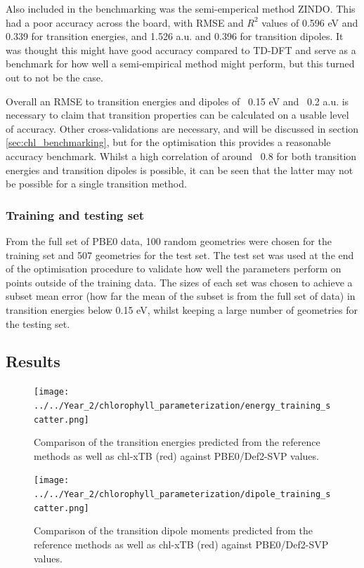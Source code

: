 Also included in the benchmarking was the semi-emperical method ZINDO. This had a
poor accuracy across the board, with RMSE and $R^2$ values of 0.596 eV and 0.339
for transition energies, and 1.526 a.u. and 0.396 for transition dipoles. It was
thought this might have good accuracy compared to TD-DFT and serve as a benchmark
for how well a semi-empirical method might perform, but this turned out to not be
the case.

Overall an RMSE to transition energies and dipoles of ~0.15 eV and ~0.2 a.u. is 
necessary to claim that transition properties can be calculated on a usable level 
of accuracy. Other cross-validations are necessary, and will be discussed in section
\ref{sec:chl_benchmarking}, but for the optimisation this provides a reasonable 
accuracy benchmark. Whilst a high correlation of around ~0.8 for both transition 
energies and transition dipoles is possible, it can be seen that the latter may 
not be possible for a single transition method.

\subsubsection{Training and testing set}
\label{subsubsec:train_test}
From the full set of PBE0 data, 100 random geometries were chosen for the training 
set and 507 geometries for the test set. The test set was used at the end of the 
optimisation procedure to validate how well the parameters perform on points outside 
of the training data. The sizes of each set was chosen to achieve a subset mean
error (how far the mean of the subset is from the full set of data) in transition
energies below 0.15 eV, whilst keeping a large number of geometries for the testing
set.

\afterpartskip
\subsection{Results}
\label{subsec:chl_opt_results}

\begin{figure}
    \centering
    \texttt{[image: ../../Year\_2/chlorophyll\_parameterization/energy\_training\_scatter.png]}
    \label{fig:energy_training_scatter}
    \caption{Comparison of the \Qy transition energies predicted from the reference
    methods as well as chl-xTB (red) against PBE0/Def2-SVP values.}
\end{figure}

\begin{figure}
    \centering
    \texttt{[image: ../../Year\_2/chlorophyll\_parameterization/dipole\_training\_scatter.png]}
    \label{fig:dipole_training_scatter}
    \caption{Comparison of the \Qy transition dipole moments predicted from the
    reference methods as well as chl-xTB (red) against PBE0/Def2-SVP values.}
\end{figure}

